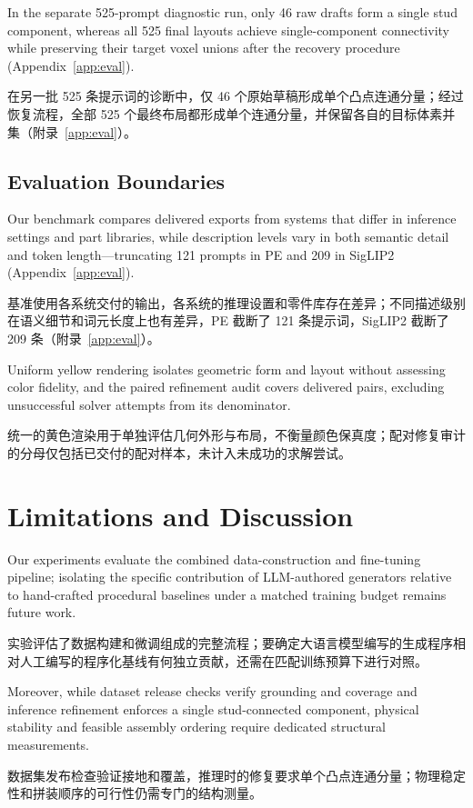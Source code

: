 \documentclass[11pt,letterpaper]{article}
\newcommand{\zh}[1]{{\chinesefont #1}}
\newcommand{\pair}[2]{\par\addvspace{4pt}\noindent
  \begin{minipage}{\linewidth}\raggedright
  #1\par\nobreak\vspace{1pt}
  {\color{translation}\chinesefont\fontsize{10.5}{15.3}\selectfont #2\par}
  \end{minipage}\par}
\begin{document}
\pair{In the separate 525-prompt diagnostic run, only 46 raw drafts form a single stud component, whereas all 525 final layouts achieve single-component connectivity while preserving their target voxel unions after the recovery procedure (Appendix~\ref{app:eval}).}{在另一批 525 条提示词的诊断中，仅 46 个原始草稿形成单个凸点连通分量；经过恢复流程，全部 525 个最终布局都形成单个连通分量，并保留各自的目标体素并集（附录~\ref{app:eval}）。}

\subsection{Evaluation Boundaries\enspace\zh{评测边界}}

\pair{Our benchmark compares delivered exports from systems that differ in inference settings and part libraries, while description levels vary in both semantic detail and token length---truncating 121 prompts in PE and 209 in SigLIP2 (Appendix~\ref{app:eval}).}{基准使用各系统交付的输出，各系统的推理设置和零件库存在差异；不同描述级别在语义细节和词元长度上也有差异，PE 截断了 121 条提示词，SigLIP2 截断了 209 条（附录~\ref{app:eval}）。}

\pair{Uniform yellow rendering isolates geometric form and layout without assessing color fidelity, and the paired refinement audit covers delivered pairs, excluding unsuccessful solver attempts from its denominator.}{统一的黄色渲染用于单独评估几何外形与布局，不衡量颜色保真度；配对修复审计的分母仅包括已交付的配对样本，未计入未成功的求解尝试。}

\clearpage

\section{Limitations and Discussion\enspace\zh{局限与讨论}}

\pair{Our experiments evaluate the combined data-construction and fine-tuning pipeline; isolating the specific contribution of LLM-authored generators relative to hand-crafted procedural baselines under a matched training budget remains future work.}{实验评估了数据构建和微调组成的完整流程；要确定大语言模型编写的生成程序相对人工编写的程序化基线有何独立贡献，还需在匹配训练预算下进行对照。}

\pair{Moreover, while dataset release checks verify grounding and coverage and inference refinement enforces a single stud-connected component, physical stability and feasible assembly ordering require dedicated structural measurements.}{数据集发布检查验证接地和覆盖，推理时的修复要求单个凸点连通分量；物理稳定性和拼装顺序的可行性仍需专门的结构测量。}
\end{document}
